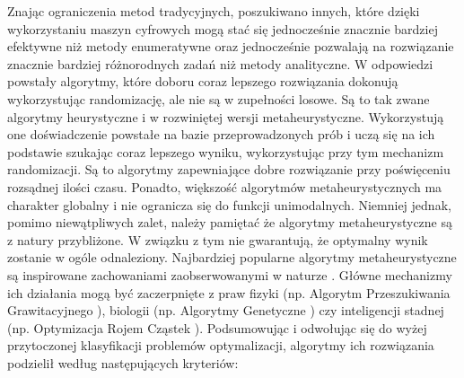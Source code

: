 Znając ograniczenia metod tradycyjnych, poszukiwano innych, które dzięki wykorzystaniu maszyn cyfrowych mogą stać się jednocześnie znacznie bardziej efektywne niż metody enumeratywne oraz jednocześnie pozwalają na rozwiązanie znacznie bardziej różnorodnych zadań niż metody analityczne. W odpowiedzi powstały algorytmy, które doboru coraz lepszego rozwiązania dokonują wykorzystując randomizację, ale nie są w zupełności losowe. Są to tak zwane algorytmy heurystyczne i w rozwiniętej wersji metaheurystyczne. Wykorzystują one doświadczenie powstałe na bazie przeprowadzonych prób i uczą się na ich podstawie szukając coraz lepszego wyniku, wykorzystując przy tym mechanizm randomizacji. Są to algorytmy zapewniające dobre rozwiązanie przy poświęceniu rozsądnej ilości czasu. Ponadto, większość algorytmów metaheurystycznych ma charakter globalny i nie ogranicza się do funkcji unimodalnych. Niemniej jednak, pomimo niewątpliwych zalet, należy pamiętać że algorytmy metaheurystyczne są z natury przybliżone. W związku z tym nie gwarantują, że optymalny wynik zostanie w ogóle odnaleziony. Najbardziej popularne algorytmy metaheurystyczne są inspirowane zachowaniami zaobserwowanymi w naturze \parencite{FisterJr.2013}. Główne mechanizmy ich działania mogą być zaczerpnięte z praw fizyki (np. Algorytm Przeszukiwania Grawitacyjnego \parencite{Rashedi2009}), biologii (np. Algorytmy Genetyczne \parencite{Goldberg1995}) czy inteligencji stadnej (np. Optymizacja Rojem Cząstek \parencite{Kennedy1995,Eberhart2001}).
Podsumowując i odwołując się do wyżej przytoczonej klasyfikacji problemów optymalizacji, algorytmy ich rozwiązania \cite{Tesch2016} podzielił według następujących kryteriów:
